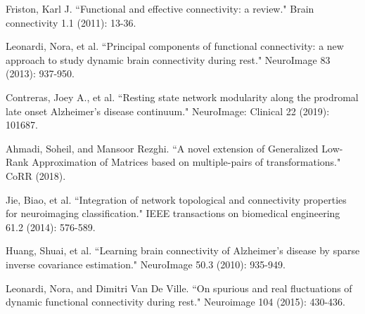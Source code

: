 \documentclass[journal]{IEEEtran}
\begin{document}
\begin{thebibliography}{1}
		
			Friston, Karl J. ``Functional and effective connectivity: a review." Brain connectivity 1.1 (2011): 13-36.
			
			
		Leonardi, Nora, et al. ``Principal components of functional connectivity: a new approach to study dynamic brain connectivity during rest." NeuroImage 83 (2013): 937-950.
	
	
	Contreras, Joey A., et al. ``Resting state network modularity along the prodromal late onset Alzheimer's disease continuum." NeuroImage: Clinical 22 (2019): 101687.
	
	
	Ahmadi, Soheil, and Mansoor Rezghi. ``A novel extension of Generalized Low-Rank Approximation of Matrices based on multiple-pairs of transformations." CoRR (2018).
	
	
	
	Jie, Biao, et al. ``Integration of network topological and connectivity properties for neuroimaging classification." IEEE transactions on biomedical engineering 61.2 (2014): 576-589.
	
	
	
	Huang, Shuai, et al. ``Learning brain connectivity of Alzheimer's disease by sparse inverse covariance estimation." NeuroImage 50.3 (2010): 935-949.
	
	
	Leonardi, Nora, and Dimitri Van De Ville. ``On spurious and real fluctuations of dynamic functional connectivity during rest." Neuroimage 104 (2015): 430-436.
	
	
	

\end{thebibliography}
\end{document}
